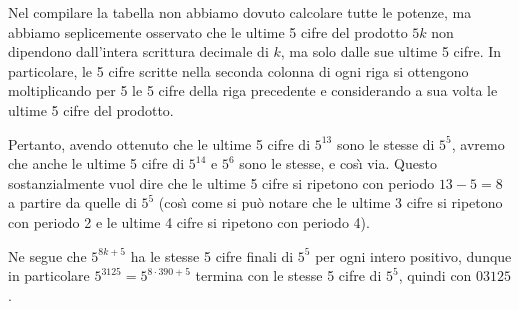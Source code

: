 {Nel compilare la tabella non abbiamo dovuto calcolare tutte le potenze, ma abbiamo seplicemente osservato che le ultime 5 cifre del prodotto $5k$ non dipendono dall'intera scrittura decimale di $k$, ma solo dalle sue ultime 5 cifre. In particolare, le 5 cifre scritte nella seconda colonna di ogni riga si ottengono moltiplicando per 5 le 5 cifre della riga precedente e considerando a sua volta le ultime 5 cifre del prodotto.

Pertanto, avendo ottenuto che le ultime 5 cifre di $5^{13}$ sono le stesse di $5^{5}$, avremo che anche le ultime 5 cifre di $5^{14}$ e $5^{6}$ sono le stesse, e cos\`{\i} via.  Questo sostanzialmente vuol dire che le ultime 5 cifre si ripetono con periodo $13-5=8$ a partire da quelle di $5^{5}$ (cos\`{\i} come si può notare che le ultime 3 cifre si ripetono con periodo 2 e le ultime 4 cifre si ripetono con periodo 4).

Ne segue che $5^{8k+5}$ ha le stesse 5 cifre finali di $5^{5}$ per 
ogni intero positivo, dunque in particolare $5^{3125}=5^{8\cdot 
390+5}$ termina con le stesse 5 cifre di $5^{5}$, quindi con $03125$.
}

\renewcommand{\Osservazioni}{\TitoloOsservazione La tecnica utilizzata
nella prima soluzione permette in realtà di dimostrare che tutti i numeri della forma $5^{8k}-1$ sono multipli di $2^{5}$.  Infatti nella scomposizione
$$5^{8k}-1 =(5^{4k}+1)(5^{2k}+1)(5^{k}+1)(5^{k}-1)$$
abbiamo 4 fattori pari (e questo assicura la divisibilità per $2^{4}$); inoltre la differenza tra gli ultimi 2 fattori è 2, e questo ci dice che uno di loro è divisibile per 4 e ci permette
di guadagnare il fattore 2 mancante. }

\renewcommand{\Commenti}{\TitoloCommenti 
La prima soluzione usa solo scomposizioni elementari. Tuttavia l'idea fondamentale, e cioè che le ultime 5 cifre di $5^{3125}$ e $5^{5}$ sono le stesse, ``arriva un po' dall'alto''. Per questo motivo è piuttosto improbabile che un solutore non esperto arrivi di primo acchito ad un approccio del genere.

La seconda soluzione è invece piuttosto standard per chi ha \emph{buona} familiarità con le classi di resto, ma proprio per questo rischia di ``tagliare le gambe'' agli altri.

La terza soluzione, di sicuro meno brillante dal punto di vista estetico, non prerequisisce nessuna conoscenza specifica, ma arriva ``sperimentalmente'' al punto fondamentale, cioè alla periodicità delle ultime 5 cifre.
}
